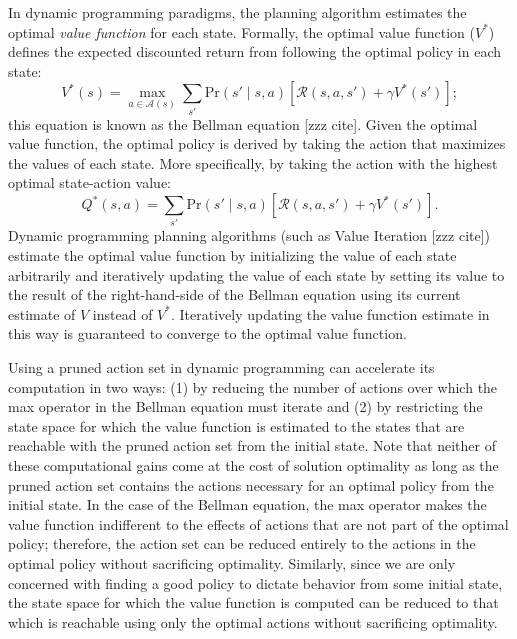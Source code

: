 \documentclass[]{article}
\begin{document}
In dynamic programming paradigms, the planning algorithm estimates the optimal {\em value function} for each state. Formally, the optimal value function ($V^*$) defines the expected discounted return from following the optimal policy in each state:
\begin{equation}
\label{eq:bellman}
V^*(s) = \max_{a \in \mathcal{A}(s)} \sum_{s'} \text{Pr}(s' \mid s, a)\left[\mathcal{R}(s,a,s') + \gamma V^*(s') \right];
\end{equation}
this equation is known as the Bellman equation [zzz cite]. Given the optimal value function, the optimal policy is derived by taking the action that maximizes the values of each state. More specifically,
by taking the action with the highest optimal state-action value:
\begin{equation}
\label{eq:qvalue}
Q^*(s,a) = \sum_{s'} \text{Pr}(s' \mid s, a)\left[\mathcal{R}(s,a,s') + \gamma V^*(s') \right].
\end{equation}
Dynamic programming planning algorithms (such as Value Iteration [zzz cite]) estimate the optimal value function by initializing the value of each state arbitrarily and iteratively updating the value
of each state by setting its value to the result of the right-hand-side of the Bellman equation using its current estimate of $V$ instead of $V^*$. Iteratively updating
the value function estimate in this way is guaranteed to converge to the optimal value function.

Using a pruned action set
in dynamic programming can accelerate its computation in two ways: (1) by reducing the number of actions
over which the max operator in the Bellman equation must iterate and (2) by restricting the state space for which the value function is estimated to the states that are reachable with the pruned action set from the initial state. Note that neither of these computational gains come at the cost of solution optimality
as long as the pruned action set contains the actions necessary for an optimal policy from the initial state. In the case of the Bellman equation, the max operator makes the value function indifferent to the effects of actions that are not part of the optimal policy; therefore, the action set can be reduced entirely to the actions in the optimal policy without sacrificing optimality. Similarly, since we are only concerned with finding a good policy to dictate behavior from some initial state, the state space for which the value function is computed can be reduced to that which is reachable using only the optimal actions without sacrificing optimality.
\end{document}

